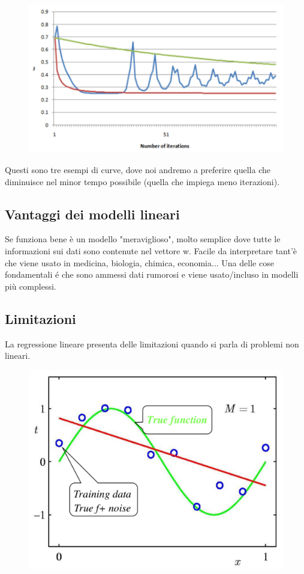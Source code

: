 \documentclass{article}
\begin{document}
\begin{figure}[H]
    \centering
    \includegraphics[scale=0.6]{Images/examplegraphloss.png}
\end{figure}

Questi sono tre esempi di curve, dove noi andremo a preferire quella che diminuisce nel minor tempo possibile (quella che impiega meno iterazioni). 

\subsection{Vantaggi dei modelli lineari}
Se funziona bene è un modello "meraviglioso", molto semplice dove tutte le informazioni sui dati sono contenute nel vettore w. Facile da interpretare tant'è che viene usato in medicina, biologia, chimica, economia... Una delle cose fondamentali é che sono ammessi dati rumorosi e viene usato/incluso in modelli più complessi.

\subsection{Limitazioni}
La regressione lineare presenta delle limitazioni quando si parla di problemi non lineari.

\begin{figure}[H]
    \centering
    \includegraphics[scale=0.35]{Images/linearnonlinear.png}
\end{figure}
\end{document}
